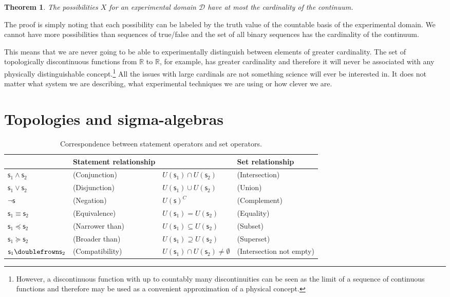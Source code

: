 \documentclass[%
reprint,
amsmath,amssymb,
aps,
prx,
]{revtex4-1}
\theoremstyle{plain}%
\newtheorem{thrm}{Theorem}[section]
\theoremstyle{definition}
\theoremstyle{remark}
\def\comp{\doublefrown}
\def\narrower{\preccurlyeq}
\def\broader{\succcurlyeq}
\def\AND{\wedge}
\def\OR{\vee}
\def\NOT{\neg}
\newcommand{\stmt}[1][s] {\mathsf{#1}}
\newcommand{\edomain}[1][D] {\mathcal{#1}}
\begin{document}
\begin{thrm}
	The possibilities $X$ for an experimental domain $\edomain$ have at most the cardinality of the continuum.
\end{thrm}

The proof is simply noting that each possibility can be labeled by the truth value of the countable basis of the experimental domain. We cannot have more possibilities than sequences of true/false and the set of all binary sequences has the cardinality of the continuum.

This means that we are never going to be able to experimentally distinguish between elements of greater cardinality. The set of topologically discontinuous functions from $\mathbb{R}$ to $\mathbb{R}$, for example, has greater cardinality and therefore it will never be associated with any physically distinguishable concept.\footnote{However, a discontinuous function with up to countably many discontinuities can be seen as the limit of a sequence of continuous functions and therefore may be used as a convenient approximation of a physical concept.} All the issues with large cardinals are not something science will ever be interested in. It does not matter what system we are describing, what experimental techniques we are using or how clever we are.

\section{Topologies and sigma-algebras}

\begin{table*}
	\centering
	\begin{tabular}{p{} p{} p{} p{}}
		& Statement relationship & & Set relationship  \\ 
		\hline 
		$\stmt_1 \AND \stmt_2$ & (Conjunction) & $U(\stmt_1) \cap U(\stmt_2)$ & (Intersection) \\ 
		$\stmt_1 \OR \stmt_2$ & (Disjunction) & $U(\stmt_1) \cup U(\stmt_2)$ & (Union) \\ 
		$\NOT \stmt$ & (Negation) & $U(\stmt)^C$ & (Complement) \\ 
		$\stmt_1 \equiv \stmt_2$ & (Equivalence) & $U(\stmt_1) = U(\stmt_2)$ & (Equality) \\ 
		$\stmt_1 \narrower \stmt_2$ & (Narrower than) & $U(\stmt_1) \subseteq U(\stmt_2)$ & (Subset) \\ 
		$\stmt_1 \broader \stmt_2$ & (Broader than) & $U(\stmt_1) \supseteq U(\stmt_2)$ & (Superset) \\ 
		$\stmt_1 \comp \stmt_2$ & (Compatibility) & $U(\stmt_1) \cap U(\stmt_2) \neq \emptyset$ & (Intersection not empty)
	\end{tabular} 
	\caption{Correspondence between statement operators and set operators.}\label{tab:statement_set}
\end{table*}
\end{document}
